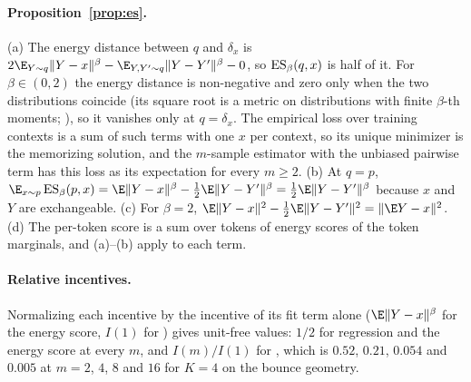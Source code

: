 \paragraph{Proposition~\ref{prop:es}.}
(a) The energy distance between $q$ and $\delta_x$ is $2\E_{Y \sim q}\|Y - x\|^\beta - \E_{Y, Y' \sim q}\|Y - Y'\|^\beta - 0$, so $\mathrm{ES}_\beta(q, x)$ is half of it. For $\beta \in (0, 2)$ the energy distance is non-negative and zero only when the two distributions coincide (its square root is a metric on distributions with finite $\beta$-th moments; \citealp{gneiting2007strictly,dawid2007geometry}), so it vanishes only at $q = \delta_x$. The empirical loss over training contexts is a sum of such terms with one $x$ per context, so its unique minimizer is the memorizing solution, and the $m$-sample estimator with the unbiased pairwise term has this loss as its expectation for every $m \ge 2$. (b) At $q = p$, $\E_{x \sim p}\,\IS_\beta(p, x) = \E\|Y - x\|^\beta - \frac{1}{2}\E\|Y - Y'\|^\beta = \frac{1}{2}\E\|Y - Y'\|^\beta$ because $x$ and $Y$ are exchangeable. (c) For $\beta = 2$, $\E\|Y - x\|^2 - \frac{1}{2}\E\|Y - Y'\|^2 = \|\E Y - x\|^2$. (d) The per-token score is a sum over tokens of energy scores of the token marginals, and (a)--(b) apply to each term.

\paragraph{Relative incentives.} Normalizing each incentive by the incentive of its fit term alone ($\E\|Y - x\|^\beta$ for the energy score, $I(1)$ for \nom{}) gives unit-free values: $1/2$ for regression and the energy score at every $m$, and $I(m)/I(1)$ for \nom{}, which is $0.52$, $0.21$, $0.054$ and $0.005$ at $m = 2$, $4$, $8$ and $16$ for $K{=}4$ on the bounce geometry.

